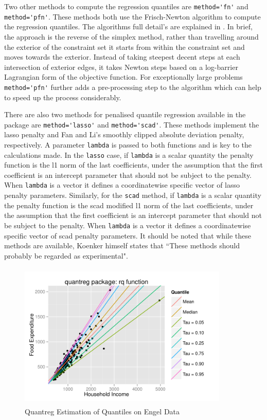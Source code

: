 \documentclass[12pt,a4paper]{report}
\begin{document}
Two other methods to compute the regression quantiles are {\small\verb"method='fn'"} and {\small\verb"method='pfn'"}. These methods both use the Frisch-Newton algorithm to compute the regression quantiles. The algorithms full detail's are explained in \citet{Frisch-Newton}. In brief, the approach is the reverse of the simplex method, rather than travelling around the exterior of the constraint set it starts from within the constraint set and moves towards the exterior. Instead of taking steepest decent steps at each intersection of exterior edges, it takes Newton steps based on a log-barrier Lagrangian form of the objective function. For exceptionally large problems {\small\verb"method='pfn'"} further adds a pre-processing step to the algorithm which can help to speed up the process considerably.
\vspace{2mm}

There are also two methods for penalised quantile regression available in the package are {\small\verb"method='lasso'"} and {\small\verb"method='scad'"}. These methods implement the lasso penalty and Fan and Li's smoothly clipped absolute deviation penalty, respectively. A parameter {\small\verb"lambda"} is passed to both functions and is key to the calculations made. In the {\small\verb"lasso"} case, if {\small\verb"lambda"} is a scalar quantity the penalty function is the l1 norm of the last coefficients, under the assumption that the first coefficient is an intercept parameter that should not be subject to the penalty. When {\small\verb"lambda"} is a vector it defines a coordinatewise specific vector of lasso penalty parameters. Similarly, for the {\small\verb"scad"} method, if {\small\verb"lambda"} is a scalar quantity the penalty function is the scad modified l1 norm of the last coefficients, under the assumption that the first coefficient is an intercept parameter that should not be subject to the penalty. When {\small\verb"lambda"} is a vector it defines a coordinatewise specific vector of scad penalty parameters. It should be noted that while these methods are available, Koenker himself states that ``These methods should probably be regarded as experimental".
\vspace{2mm}

\begin{figure}[ht]\centering
    \includegraphics[width=10cm, height=7cm]{PlotofQuantreg.pdf}
    \caption{Quantreg Estimation of Quantiles on Engel Data}
    \label{plot:quantreg-example}
\end{figure}
\end{document}
